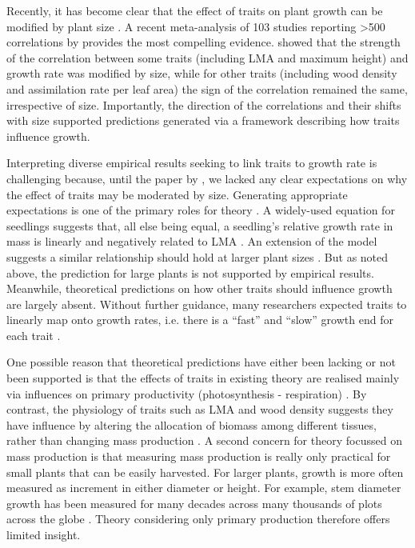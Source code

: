 \documentclass[a4paper,11pt]{article}
\begin{document}
Recently, it has become clear that the effect of traits on plant growth can be modified by plant size \citep{Falster-2011, Ruger-2012, Iida-2014, Visser-2016, Gibert-2016}. A recent meta-analysis of 103 studies reporting \textgreater 500 correlations by \citet{Gibert-2016} provides the most compelling evidence. \citet{Gibert-2016} showed that the strength of the correlation between some traits (including LMA and maximum height) and growth rate was modified by size, while for other traits (including wood density and assimilation rate per leaf area) the sign of the correlation remained the same, irrespective of size. Importantly, the direction of the correlations and their shifts with size supported predictions generated via a framework describing how traits influence growth.

Interpreting diverse empirical results seeking to link traits to growth rate is challenging because, until the paper by \citet{Gibert-2016}, we lacked any clear expectations on why the effect of traits may be moderated by size. Generating appropriate expectations is one of the primary roles for theory \citep{Kokko-2007}. A widely-used equation for seedlings suggests that, all else being equal, a seedling's relative growth rate in mass is linearly and negatively related to LMA \citep{Lambers-1992, Cornelissen-1996, Wright-2000}. An extension of the model suggests a similar relationship should hold at larger plant sizes \citep{Enquist-2007}. But as noted above, the prediction for large plants is not supported by empirical results. Meanwhile, theoretical predictions on how other traits should influence growth are largely absent. Without further guidance, many researchers expected traits to linearly map onto growth rates, i.e. there is a ``fast'' and ``slow'' growth end for each trait \citep[e.g.][]{Grime-1977, Poorter-2008, Chave-2009, Paine-2015}.

One possible reason that theoretical predictions have either been lacking or not been supported is that the effects of traits in existing theory are realised mainly via influences on primary productivity (photosynthesis - respiration) \citep{Wright-2000, Enquist-2007}. By contrast, the physiology of traits such as LMA and wood density suggests they have influence by altering the allocation of biomass among different tissues, rather than changing mass production \citep{Falster-2011, Duursma-2016, Gibert-2016}. A second concern for theory focussed on mass production is that measuring mass production is really only practical for small plants that can be easily harvested. For larger plants, growth is more often measured as increment in either diameter or height. For example, stem diameter growth has been measured for many decades across many thousands of plots across the globe \citep{Purves-2008, Anderson-2015, Kunstler-2016}. Theory considering only primary production therefore offers limited insight.
\end{document}
